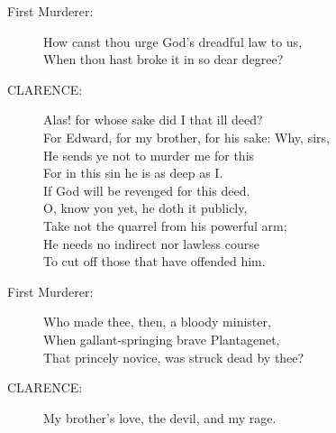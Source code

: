 \documentclass{article}
\begin{document}
\begin{description}
\item[First Murderer:] 
\hspace{1pt}How canst thou urge God's dreadful law to us,\\
\hspace{1pt}When thou hast broke it in so dear degree?\\
\end{description}
\begin{description}
\item[CLARENCE:] 
\hspace{1pt}Alas! for whose sake did I that ill deed?\\
\hspace{1pt}For Edward, for my brother, for his sake: Why, sirs,\\
\hspace{1pt}He sends ye not to murder me for this\\
\hspace{1pt}For in this sin he is as deep as I.\\
\hspace{1pt}If God will be revenged for this deed.\\
\hspace{1pt}O, know you yet, he doth it publicly,\\
\hspace{1pt}Take not the quarrel from his powerful arm;\\
\hspace{1pt}He needs no indirect nor lawless course\\
\hspace{1pt}To cut off those that have offended him.\\
\end{description}
\begin{description}
\item[First Murderer:] 
\hspace{1pt}Who made thee, then, a bloody minister,\\
\hspace{1pt}When gallant-springing brave Plantagenet,\\
\hspace{1pt}That princely novice, was struck dead by thee?\\
\end{description}
\begin{description}
\item[CLARENCE:] 
\hspace{1pt}My brother's love, the devil, and my rage.\\
\end{description}
\end{document}
